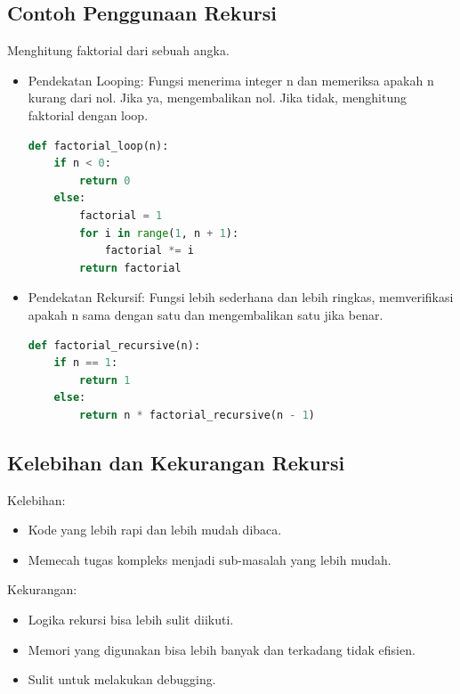 \documentclass{article}
\begin{document}
\subsection{Contoh Penggunaan Rekursi}
Menghitung faktorial dari sebuah angka.
\begin{itemize}
    \item Pendekatan Looping: Fungsi menerima integer n dan memeriksa apakah n kurang dari nol. Jika ya, mengembalikan nol. Jika tidak, menghitung faktorial dengan loop.
          \begin{lstlisting}[language=Python, caption={}, captionpos=b]
def factorial_loop(n):
    if n < 0:
        return 0
    else:
        factorial = 1
        for i in range(1, n + 1):
            factorial *= i
        return factorial
\end{lstlisting}
    \item Pendekatan Rekursif: Fungsi lebih sederhana dan lebih ringkas, memverifikasi apakah n sama dengan satu dan mengembalikan satu jika benar.
          \begin{lstlisting}[language=Python, caption={}, captionpos=b]
def factorial_recursive(n):
    if n == 1:
        return 1
    else:
        return n * factorial_recursive(n - 1)
\end{lstlisting}
\end{itemize}

\subsection{Kelebihan dan Kekurangan Rekursi}
Kelebihan:
\begin{itemize}
    \item Kode yang lebih rapi dan lebih mudah dibaca.
    \item Memecah tugas kompleks menjadi sub-masalah yang lebih mudah.
\end{itemize}
Kekurangan:
\begin{itemize}
    \item Logika rekursi bisa lebih sulit diikuti.
    \item Memori yang digunakan bisa lebih banyak dan terkadang tidak efisien.
    \item Sulit untuk melakukan debugging.
\end{itemize}
\end{document}
